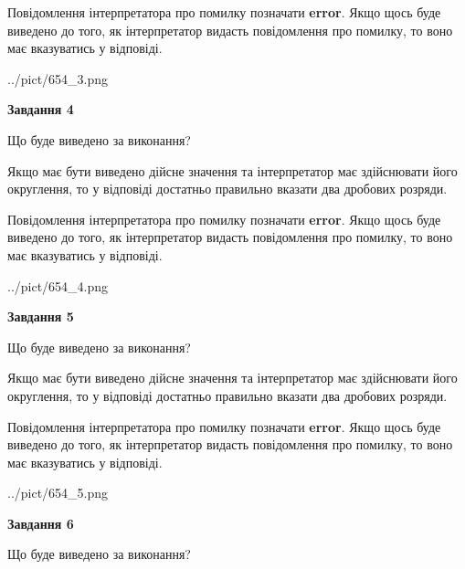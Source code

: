 \documentclass[12pt, ukrainian]{article}
\begin{document}
{\begin {Large}
Повідомлення інтерпретатора про помилку позначати \textbf{error}.
Якщо щось буде виведено до того, як інтерпретатор видасть повідомлення про помилку, 
то воно має вказуватись у відповіді. \par

\begin{center}
	{../pict/654_3.png}
\end{center}
\newpage

{\begin {center}\textbf{Завдання 4}\end {center}}\par
Що буде виведено за виконання? \par

Якщо має бути виведено дійсне значення та інтерпретатор має здійснювати його округлення, 
то у відповіді достатньо правильно вказати два дробових розряди.

Повідомлення інтерпретатора про помилку позначати \textbf{error}.
Якщо щось буде виведено до того, як інтерпретатор видасть повідомлення про помилку, 
то воно має вказуватись у відповіді. \par

\begin{center}
	{../pict/654_4.png}
\end{center}
\newpage

{\begin {center}\textbf{Завдання 5}\end {center}}\par
Що буде виведено за виконання? \par

Якщо має бути виведено дійсне значення та інтерпретатор має здійснювати його округлення, 
то у відповіді достатньо правильно вказати два дробових розряди.

Повідомлення інтерпретатора про помилку позначати \textbf{error}.
Якщо щось буде виведено до того, як інтерпретатор видасть повідомлення про помилку, 
то воно має вказуватись у відповіді. \par

\begin{center}
	{../pict/654_5.png}
\end{center}
\newpage

{\begin {center}\textbf{Завдання 6}\end {center}}\par
Що буде виведено за виконання? \par


\end{Large}}
\end{document}
